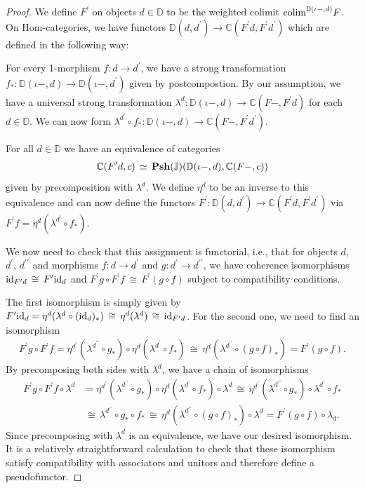\documentclass[12pt,oneside,reqno,a4paper]{article}
\theoremstyle{definition}
\newcommand{\Psh}[1]{\textbf{\textup{Psh}}(#1)}
\newcommand{\iso}{\,\cong\,}
\renewcommand{\equiv}{\,\simeq\,}
\newcommand{\id}{\textup{id}}
\newcommand{\bC}{\mathbb{C}}
\newcommand{\bD}{\mathbb{D}}
\newcommand{\bJ}{\mathbb{J}}
\newcommand{\p}{^\prime}
\newcommand{\pp}{^{\prime\prime}}
\newcommand{\colim}{\textup{colim}}
\begin{document}
\begin{proof}
We define $F\p$ on objects $d\in\bD$ to be the weighted colimit $\colim^{\bD(\iota-,d)}F$. On Hom-categories, we have functors $\bD(d,d\p) \to \bC(F\p d,F\p d\p)$ which are defined in the following way:

For every 1-morphism $f:d\to d\p$, we have a strong transformation $f_*:\bD(\iota-,d)\to \bD(\iota-,d\p)$ given by postcompostion. By our assumption, we have a universal strong transformation $\lambda^d:\bD(\iota-,d)\to\bC(F-,F\p d)$ for each $d\in\bD$. We can now form $\lambda^{d\p}\circ f_*: \bD(\iota-,d)\to\bC(F-,F\p d\p)$.

For all $d\in \bD$ we have an equivalence of categories
\begin{align*}
\bC(F\p d, c)\equiv \Psh{\bJ}(\bD(\iota-,d),\bC(F-,c))
\end{align*}
given by precomposition with $\lambda^d$. We define $\eta^d$ to be an inverse to this equivalence and can now define the functors $F\p:\bD(d,d\p) \to \bC(F\p d,F\p d\p)$ via $F\p f =\eta^d(\lambda^{d\p}\circ f_*)$.

We now need to check that this assignment is functorial, i.e., that for objects $d$, $d\p$, $d\pp$ and morphisms $f:d\to d\p$ and $g:d\p \to d\pp$,  we have coherence isomorphisms $\id_{F\p d}\iso F\p \id_d$ and $F\p g \circ F\p f \iso F\p(g\circ f)$ subject to compatibility conditions.

The first isomorphism is simply given by $F\p \id_d = \eta^d(\lambda^d \circ (\id_d)_*) \iso \eta^d(\lambda^d)\iso \id_{F\p d}$. For the second one, we need to find an isomorphism
\begin{align*}
F\p g\circ F\p f=\eta^{d\p}(\lambda^{d\pp}\circ g_*)\circ \eta^d(\lambda^{d\p} \circ f_*)\iso \eta^d(\lambda^{d\pp}\circ(g\circ f)_*)=F\p(g\circ f). 
\end{align*}
By precomposing both sides with $\lambda^d$, we have a chain of isomorphisms
\begin{align*}
F\p g\circ F\p f \circ \lambda^d & = \eta^{d\p}(\lambda^{d\pp}\circ g_*)\circ \eta^d(\lambda^{d\p} \circ f_*)\circ \lambda^d \iso \eta^{d\p}(\lambda^{d\pp}\circ g_*)\circ \lambda^{d\p} \circ f_* \\
& \iso \lambda^{d\pp}\circ g_* \circ f_* \iso \eta^d(\lambda^{d\pp}\circ(g\circ f)_*) \circ \lambda^d = F\p(g\circ f) \circ \lambda_d.
\end{align*}
Since precomposing with $\lambda^d$ is an equivalence, we have our desired isomorphism. It is a relatively straightforward calculation to check that these isomorphism satisfy compatibility with associators and unitors and therefore define a pseudofunctor.


\end{proof}
\end{document}
